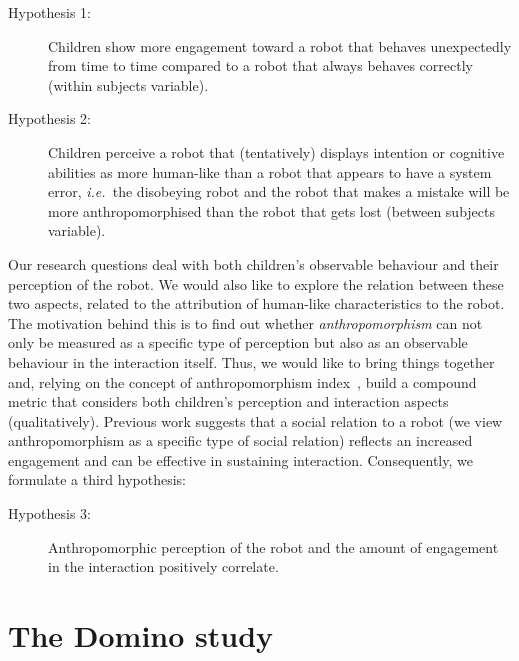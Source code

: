 \documentclass{sig-alternate}
\newcommand{\ie}{{\textit{i.e.~}}}
\begin{document}
\begin{description}

    \item[Hypothesis 1:] Children show more engagement toward a robot that
        behaves unexpectedly from time to time compared to a robot that always
        behaves correctly (within subjects variable).

    \item[Hypothesis 2:] Children perceive a robot that (tentatively) displays
        intention or cognitive abilities as more human-like than a robot that
        appears to have a system error, \ie the disobeying robot and the robot
        that makes a mistake will be more anthropomorphised than the robot that
        gets lost (between subjects variable).

\end{description}

Our research questions deal with both children's observable behaviour and their
perception of the robot. We would also like to explore the relation between
these two aspects, related to the attribution of human-like characteristics to
the robot. The motivation behind this is to find out whether
\textit{anthropomorphism} can not only be measured as a specific type of
perception but also as an observable behaviour in the interaction itself. Thus,
we would like to bring things together and, relying on the concept of
anthropomorphism index~\cite{fink2014dynamics}, build a compound metric that
considers both children's perception and interaction aspects (qualitatively).
Previous work suggests that a social relation to a robot (we view
anthropomorphism as a specific type of social relation) reflects an increased
engagement and can be effective in sustaining interaction.  Consequently, we
formulate a third hypothesis:

\begin{description}

    \item[Hypothesis 3:] Anthropomorphic perception of the robot and the amount
    of engagement in the interaction positively correlate.

\end{description}



\section{The Domino study}
\end{document}
